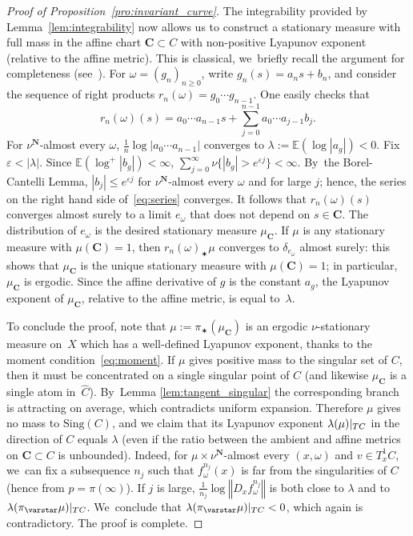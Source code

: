 \documentclass[JEP,XML,SOM,Unicode,published]{cedram}
\let\e\varepsilon
\newcommand{\norm}[1]{{\left\Vert#1\right\Vert}}
\newcommand{\abs}[1]{\left\vert#1\right\vert}
\newcommand{\rest}[1]{ \arrowvert_{#1}}
\newcommand{\unsur}[1]{\frac{1}{#1}}
\newcommand{\ee}{\mathbb{E}}
\def\C{\mathbf{C}}
\def\N{\mathbf{N}}
\newcommand{\Sing}{{\mathrm{Sing}}}
\theoremstyle{plain}
\theoremstyle{definition}
\begin{document}
\begin{proof}[Proof of Proposition~\ref{pro:invariant_curve}]
The integrability provided by Lemma~\ref{lem:integrability} now allows us to construct a stationary
measure with full mass in the affine chart $\C\subset C$ with non-positive Lyapunov exponent
(relative to the affine metric).
This is classical, we~briefly recall the argument for completeness (see~\cite{brandt}).
For $\omega = (g_n)_{n\geq 0}$, write $g_n(s) = a_ns+b_n$, and
consider the sequence of right products
$r_n(\omega) = g_0\cdots g_{n-1}$. One easily checks that
\begin{equation}\label{eq:series}
r_n(\omega) (s) = a_{0}\cdots a_{n-1}s + \sum_{j=0}^{n-1} a_{0}\cdots a_{j-1} b_{j}.
\end{equation}
For $\nu^\N$-almost every $\omega$, $\unsur{n} \log \abs{a_{0}\cdots a_{n-1}}$ converges to $\lambda := \ee(\log\abs{a_g})<0$.
Fix $\e < \abs{\lambda}$. Since $\ee(\log^+\abs{b_g})<\infty$, $\sum_{j=0}^\infty \nu\{ \abs{b_g} > e^{\e j} \} <\infty$. By~the Borel-Cantelli Lemma, $\abs{b_{j}}\leq e^{\e j} $ for $\nu^\N$-almost every $\omega$ and for large $j$; hence, the series on
the right hand side of~\eqref{eq:series} converges. It follows that $r_n(\omega) (s) $ converges almost surely to a limit $e_\omega$
that does not depend on $s\in \C$. The distribution of $e_\omega$ is the desired stationary measure $\mu_\C$.
If $\mu$ is any stationary measure with $\mu(\C) = 1$, then $r_n(\omega)_\varstar \mu$ converges to
$\delta_{e_\omega}$ almost surely: this shows that $\mu_\C$ is the unique stationary measure
with $\mu(\C) = 1$; in particular, $\mu_\C$ is ergodic.
Since the affine derivative of $g$ is the constant $a_g$,
the Lyapunov exponent of $\mu_\C$, relative to the affine metric, is equal to~$\lambda$.

To conclude the proof, note that $\mu:=\pi_\varstar (\mu_\C)$ is an ergodic
$\nu$-stationary measure on~$X$ which has a well-defined Lyapunov exponent, thanks to the moment condition~\eqref{eq:moment}.
If $\mu$ gives positive mass to the singular set of $C$, then it must be concentrated on a
single singular point of $C$ (and likewise $\mu_\C$ is a single atom in~$\hat C$). By~Lemma \ref{lem:tangent_singular} the corresponding branch is
attracting on average, which contradicts uniform expansion. Therefore $\mu$ gives no mass to
$\Sing(C)$, and we claim that its Lyapunov exponent $\lambda(\mu)\rest{TC}$
in the direction of $C$ equals $\lambda$ (even if the ratio between the
ambient and affine metrics on $\C\subset C$ is unbounded). Indeed, for
$\mu\times \nu^\N$-almost every $(x,\omega)$ and $v\in T_x^1C$, we~can fix a subsequence $n_j$ such that $f^{n_j}_\omega(x)$ is far
from the singularities of $C$ (hence from $p=\pi(\infty)$). If $j$ is large,
$\unsur{n_j}\log\norm{D_xf^{n_j}_\omega}$ is both close to $\lambda$ and to
$\lambda (\pi_\varstar \mu)\rest{TC}$. We~conclude that $\lambda (\pi_\varstar \mu)\rest{TC}<0$, which again is contradictory. The proof is complete. \end{proof}
\end{document}
